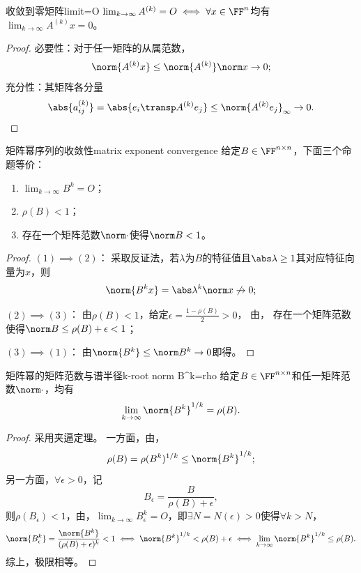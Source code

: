 \begin{theorem}
    {收敛到零矩阵}{limit=O}
    $\lim_{k\to\infty}A^{(k)}=O\iff\forall x\in\FF^n$均有$\lim_{k\to\infty}A^{(k)}x=0$。
\end{theorem}

\begin{proof}
    必要性：对于任一矩阵的从属范数，
    \[
        \norm{A^{(k)}x}\leq\norm{A^{(k)}}\norm x\to0;
    \]
    充分性：其矩阵各分量
    \[
        \abs{a_{ij}^{(k)}}=\abs{e_i\transp A^{(k)}e_j}\leq\norm{A^{(k)}e_j}_\infty\to 0.
        \qedhere
    \]
\end{proof}

\begin{theorem}
    {矩阵幂序列的收敛性}{matrix exponent convergence}
    给定$B\in\FF^{n\times n}$，下面三个命题等价：
    \begin{enumerate}
        \item $\lim_{k\to\infty}B^k=O$；
        \item $\rho(B)<1$；
        \item 存在一个矩阵范数$\norm\cdot$使得$\norm B<1$。
    \end{enumerate}
\end{theorem}

\begin{proof}
    $(1)\implies(2)$：
    采取反证法，若$\lambda$为$B$的特征值且$\abs\lambda\geq 1$其对应特征向量为$x$，则 
    \[
        \norm{B^kx}=\abs\lambda^k\norm x\not\to 0;
    \]

    $(2)\implies(3)$：
    由$\rho(B)<1$，给定$\epsilon=\frac{1-\rho(B)}2>0$，
    由，
    存在一个矩阵范数使得$\norm B\leq\rho(B)+\epsilon<1$；

    $(3)\implies(1)$：
    由$\norm{B^k}\leq\norm B^k\to0$即得。
\end{proof}

\begin{theorem}
    {矩阵幂的矩阵范数与谱半径}{k-root norm B^k=rho}
    给定$B\in\FF^{n\times n}$和任一矩阵范数$\norm\cdot$，均有
    \begin{equation}
        \lim_{k\to\infty}\norm{B^k}^{1/k}=\rho(B).
    \end{equation}
\end{theorem}

\begin{proof}
    采用夹逼定理。
    一方面，由，
    \[
        \rho(B)=\rho(B^k)^{1/k}\leq\norm{B^k}^{1/k};
    \]
    另一方面，$\forall\epsilon>0$，记 
    \[
        B_\epsilon=\frac{B}{\rho(B)+\epsilon},
    \]
    则$\rho(B_\epsilon)<1$，由，$\lim_{k\to\infty}B_\epsilon^k=O$，即$\exists N=N(\epsilon)>0$使得$\forall k>N$，
    \[
        \norm{B_\epsilon^k}=\frac{\norm{B^k}}{(\rho(B)+\epsilon)^k}<1\iff\norm{B^k}^{1/k}<\rho(B)+\epsilon\iff\lim_{k\to\infty}\norm{B^k}^{1/k}\leq\rho(B).
    \]
    综上，极限相等。    
\end{proof}

